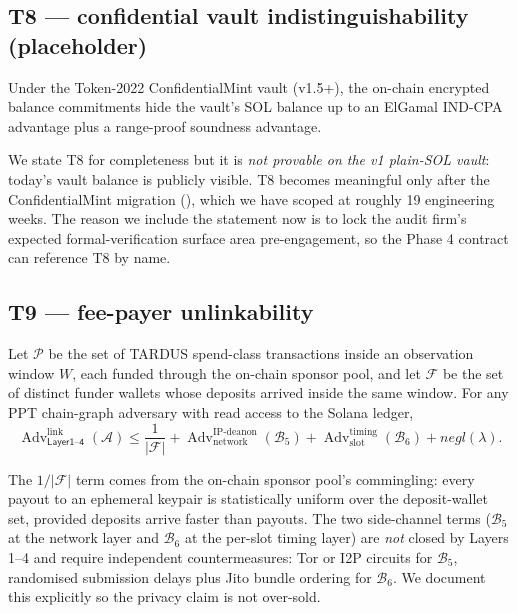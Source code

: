 \subsection{T8 --- confidential vault indistinguishability (placeholder)}

\begin{theorem}
\label{thm:T8}
Under the Token-2022 ConfidentialMint vault (v1.5+), the on-chain encrypted balance commitments hide the vault's SOL balance up to an ElGamal IND-CPA advantage plus a range-proof soundness advantage.
\end{theorem}

We state T8 for completeness but it is \emph{not provable on the v1 plain-SOL vault}: today's vault balance is publicly visible. T8 becomes meaningful only after the ConfidentialMint migration (), which we have scoped at roughly 19 engineering weeks. The reason we include the statement now is to lock the audit firm's expected formal-verification surface area pre-engagement, so the Phase 4 contract can reference T8 by name.

\subsection{T9 --- fee-payer unlinkability}
\label{sec:t9}

\begin{theorem}
\label{thm:T9}
Let $\mathcal{P}$ be the set of TARDUS spend-class transactions inside an observation window $W$, each funded through the on-chain sponsor pool, and let $\mathcal{F}$ be the set of distinct funder wallets whose deposits arrived inside the same window. For any PPT chain-graph adversary with read access to the Solana ledger,
\[
  \operatorname{Adv}^{\mathrm{link}}_{\mathsf{Layer 1\text{--}4}}(\mathcal{A}) \leq
  \frac{1}{|\mathcal{F}|} +
  \operatorname{Adv}^{\mathrm{IP\text{-}deanon}}_{\mathrm{network}}(\mathcal{B}_5) +
  \operatorname{Adv}^{\mathrm{timing}}_{\mathrm{slot}}(\mathcal{B}_6) +
  \mathit{negl}(\lambda).
\]
\end{theorem}

The $1/|\mathcal{F}|$ term comes from the on-chain sponsor pool's commingling: every payout to an ephemeral keypair is statistically uniform over the deposit-wallet set, provided deposits arrive faster than payouts. The two side-channel terms ($\mathcal{B}_5$ at the network layer and $\mathcal{B}_6$ at the per-slot timing layer) are \emph{not} closed by Layers 1--4 and require independent countermeasures: Tor or I2P circuits for $\mathcal{B}_5$, randomised submission delays plus Jito bundle ordering for $\mathcal{B}_6$. We document this explicitly so the privacy claim is not over-sold.

